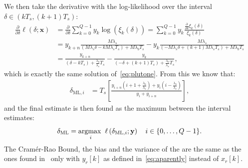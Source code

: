 \noindent
We then take the derivative with the log-likelihood over the interval \(\delta \in(kT_s,(k+1)T_s)\):
\begin{equation}
\begin{aligned}
\frac{\partial}{\partial \delta} \ell(\delta ; \mathbf{x})
&= \frac{\partial}{\partial \delta}\sum_{k=0}^{Q-1} y_k \log \left( \xi_k(\delta)\right)
=  \sum_{k=0}^{Q-1}y_k\frac{ \frac{\partial}{\partial \delta}\xi_k(\delta)}{\xi_k(\delta)}\\
&= y_{k+n} \frac{M\lambda_s}{\left(M\lambda_s \delta-k M\lambda_s T_s\right)+M\lambda_b T_s}-y_k \frac{M\lambda_s}{\left(-M\lambda_s \delta+(k+1) M\lambda_s T_s\right)+M\lambda_b T_s}\\
&= \frac{y_{k+n}}{\left( \delta-k  T_s\right)+\frac{\lambda_b}{\lambda_s} T_s}- \frac{y_k}{\left(- \delta+(k+1)  T_s\right)+\frac{\lambda_b}{\lambda_s} T_s},
\end{aligned}
\label{eq:thesumming}
\end{equation}
which is exactly the same solution of~\eqref{eq:plutone}. From this we know that:
\begin{equation}
\begin{aligned}
\delta_{\mathrm{ML}, i}
&=T_s\left[\frac{y_{i+n}\left(i+1 +\frac{\lambda_b}{\lambda_s} \right)+y_i\left(i -\frac{\lambda_b}{\lambda_s} \right)}{y_i+y_{i+n}}\right],
\end{aligned} 
\end{equation}
and the final estimate is then found as the maximum between the interval estimates:
\begin{equation}
    \delta_{\mathrm{ML}}=\underset{i}{\operatorname*{argmax\;}} \; \ell\left(\delta_{\mathrm{ML}, i} ; \mathbf{y}\right) \quad i\in\{0, \ldots, Q-1\}.
    \label{eq:estimatestupid}
\end{equation}
The Cramér-Rao Bound, the bias and the variance of the are the same as the ones found in~ only with \(y_r[k]\) as defined in~\eqref{eq:aparently} instead of \(x_r[k]\).